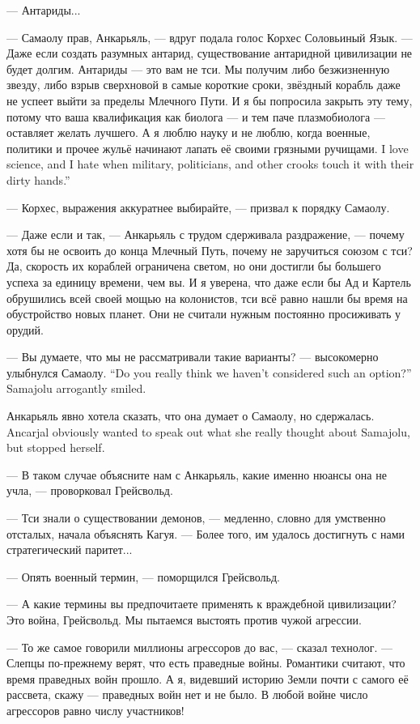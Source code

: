 --- Антариды...

--- Самаолу прав, Анкарьяль, --- вдруг подала голос Корхес Соловьиный Язык.
--- Даже если создать разумных антарид, существование антаридной цивилизации не будет долгим.
Антариды --- это вам не тси.
Мы получим либо безжизненную звезду, либо взрыв сверхновой в самые короткие сроки, звёздный корабль даже не успеет выйти за пределы Млечного Пути.
И я бы попросила закрыть эту тему, потому что ваша квалификация как биолога --- и тем паче плазмобиолога --- оставляет желать лучшего.
{А я люблю науку и не люблю, когда военные, политики и прочее жульё начинают лапать её своими грязными ручищами.}
{I love science, and I hate when military, politicians, and other crooks touch it with their dirty hands.''}

--- Корхес, выражения аккуратнее выбирайте, --- призвал к порядку Самаолу.

--- Даже если и так, --- Анкарьяль с трудом сдерживала раздражение, --- почему хотя бы не освоить до конца Млечный Путь, почему не заручиться союзом с тси?
Да, скорость их кораблей ограничена светом, но они достигли бы большего успеха за единицу времени, чем вы.
И я уверена, что даже если бы Ад и Картель обрушились всей своей мощью на колонистов, тси всё равно нашли бы время на обустройство новых планет.
Они не считали нужным постоянно просиживать у орудий.

{--- Вы думаете, что мы не рассматривали такие варианты? --- высокомерно улыбнулся Самаолу.}
{``Do you really think we haven't considered such an option?'' Samajolu arrogantly smiled.}

{Анкарьяль явно хотела сказать, что она думает о Самаолу, но сдержалась.}
{Ancarjal obviously wanted to speak out what she really thought about Samajolu, but stopped herself.}

--- В таком случае объясните нам с Анкарьяль, какие именно нюансы она не учла, --- проворковал Грейсвольд.

--- Тси знали о существовании демонов, --- медленно, словно для умственно отсталых, начала объяснять Кагуя.
--- Более того, им удалось достигнуть с нами стратегический паритет...

--- Опять военный термин, --- поморщился Грейсвольд.

--- А какие термины вы предпочитаете применять к враждебной цивилизации?
Это война, Грейсвольд.
Мы пытаемся выстоять против чужой агрессии.

--- То же самое говорили миллионы агрессоров до вас, --- сказал технолог.
--- Слепцы по-прежнему верят, что есть праведные войны.
Романтики считают, что время праведных войн прошло.
А я, видевший историю Земли почти с самого её рассвета, скажу --- праведных войн нет и не было.
В любой войне число агрессоров равно числу участников!

